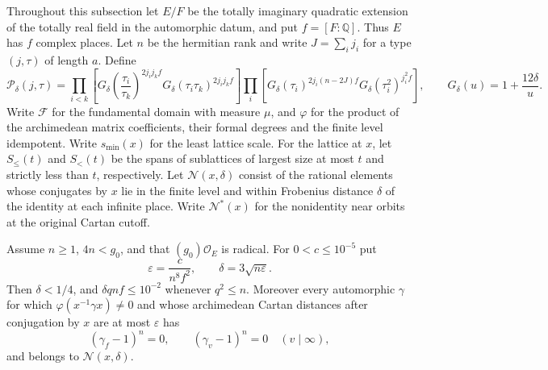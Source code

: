 Throughout this subsection let $E/F$ be the totally imaginary quadratic extension of the totally real field in the automorphic datum, and put $f=[F:\mathbb Q]$. Thus $E$ has $f$ complex places. Let $n$ be the hermitian rank and write $J=\sum_i j_i$ for a type $(j,\tau)$ of length $a$. Define
\[
 \mathcal P_\delta(j,\tau)=
 \prod_{i<k}\!\left[G_\delta\!\left(\frac{\tau_i}{\tau_k}\right)^{2j_ij_kf}
 G_\delta(\tau_i\tau_k)^{2j_ij_kf}\right]
 \prod_i\!\left[G_\delta(\tau_i)^{2j_i(n-2J)f}
 G_\delta(\tau_i^2)^{j_i^2f}\right],
 \qquad G_\delta(u)=1+\frac{12\delta}{u}.
\]
Write $\mathcal F$ for the fundamental domain with measure $\mu$, and $\varphi$ for the product of the archimedean matrix coefficients, their formal degrees and the finite level idempotent. Write $s_{\min}(x)$ for the least lattice scale. For the lattice at $x$, let $S_{\le}(t)$ and $S_{<}(t)$ be the spans of sublattices of largest size at most $t$ and strictly less than $t$, respectively. Let $\mathcal N(x,\delta)$ consist of the rational elements whose conjugates by $x$ lie in the finite level and within Frobenius distance $\delta$ of the identity at each infinite place. Write $\mathcal N^*(x)$ for the nonidentity near orbits at the original Cartan cutoff.

\begin{proposition}\label{fr:prop:near-unipotent}
Assume $n\ge1$, $4n<g_0$, and that $(g_0)\mathcal O_E$ is radical. For $0<c\le10^{-5}$ put
\[
 \varepsilon=\frac{c}{n^8f^2},\qquad \delta=3\sqrt{n\varepsilon}.
\]
Then $\delta<1/4$, and $\delta qnf\le10^{-2}$ whenever $q^2\le n$. Moreover every automorphic $\gamma$ for which $\varphi(x^{-1}\gamma x)\ne0$ and whose archimedean Cartan distances after conjugation by $x$ are at most $\varepsilon$ has
\[
 (\gamma_f-1)^n=0,\qquad (\gamma_v-1)^n=0\quad(v\mid\infty),
\]
and belongs to $\mathcal N(x,\delta)$.
\end{proposition}

